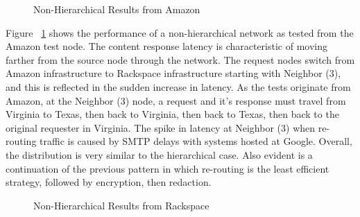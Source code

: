 
\begin{figure}[htbp]
\begin{minipage}[b]{0.5\linewidth}
\centering
{}
\end{minipage}
\begin{minipage}[b]{0.5\linewidth}
\centering
{}
\end{minipage}
\caption{Non-Hierarchical Results from Amazon}
\label{fig:model:nh-amazon-results}
\end{figure}

Figure ~\ref{fig:model:nh-amazon-results} shows the performance of a non-hierarchical network as tested from the Amazon test node.  The content response latency is characteristic of moving farther from the source node through the network.  The request nodes switch from Amazon infrastructure to Rackspace infrastructure starting with Neighbor (3), and this is reflected in the sudden increase in latency.  As the tests originate from Amazon, at the Neighbor (3) node, a request and it's response must travel from Virginia to Texas, then back to Virginia, then back to Texas, then back to the original requester in Virginia.  The spike in latency at Neighbor (3) when re-routing traffic is caused by SMTP delays with systems hosted at Google.  Overall, the distribution is very similar to the hierarchical case.  Also evident is a continuation of the previous pattern in which re-routing is the least efficient strategy, followed by encryption, then redaction.


\begin{figure}[htbp]
\begin{minipage}[b]{0.5\linewidth}
\centering
{}
\end{minipage}
\begin{minipage}[b]{0.5\linewidth}
\centering
{}
\end{minipage}
\caption{Non-Hierarchical Results from Rackspace}
\label{fig:model:nh-rackspace-results}
\end{figure}

